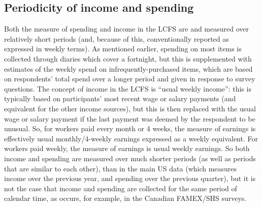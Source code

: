 \subsection{Periodicity of income and spending}
Both the measure of spending and income in the LCFS are and measured over relatively short periods (and, because of this, conventionally reported as expressed in weekly terms). As mentioned earlier,  spending on most items is collected through diaries which cover a fortnight, but this is supplemented with estimates of the weekly spend on infrequently-purchased items, which are based on respondents' total spend over a longer period and given in response to survey questions. The concept of income in the LCFS is ``usual weekly income'': this is typically based on participants' most recent wage or salary payments (and equivalent for the other income sources), but this is then replaced with the usual wage or salary payment if the last payment was deemed by the respondent to be unusual.  So, for workers paid every month or 4 weeks, the measure of earnings is effectively usual monthly/4-weekly earnings expressed as a weekly equivalent. For workers paid weekly, the measure of earnings is usual weekly earnings.  So both income and spending are measured over much shorter periods (as well as periods that are similar to each other), than in the main US data (which measures income over the previous year, and spending over the previous quarter), but it is not the case that income and spending are collected for the same period of calendar time, as occurs, for example, in the Canadian FAMEX/SHS surveys.
